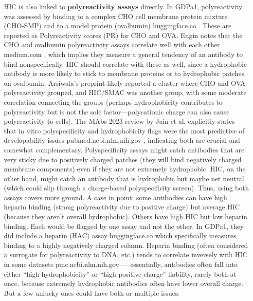 \documentclass[12pt]{article}
\begin{document}
HIC is also linked to \textbf{polyreactivity assays} directly. In GDPa1, polyreactivity was assessed by binding to a complex CHO cell membrane protein mixture (CHO-SMP) and to a model protein (ovalbumin)
huggingface.co
. These are reported as Polyreactivity scores (PR) for CHO and OVA. Engin notes that the CHO and ovalbumin polyreactivity assays correlate well with each other
medium.com
, which implies they measure a general tendency of an antibody to bind nonspecifically. HIC should correlate with these as well, since a hydrophobic antibody is more likely to stick to membrane proteins or to hydrophobic patches on ovalbumin. Arsiwala’s preprint likely reported a cluster where CHO and OVA polyreactivity grouped, and HIC/SMAC was another group, with some moderate correlation connecting the groups (perhaps hydrophobicity contributes to polyreactivity but is not the sole factor—polycationic charge can also cause polyreactivity to cells). The MAbs 2023 review by Jain et al. explicitly states that in vitro polyspecificity and hydrophobicity flags were the most predictive of developability issues
pubmed.ncbi.nlm.nih.gov
, indicating both are crucial and somewhat complementary. Polyspecificity assays might catch antibodies that are very sticky due to positively charged patches (they will bind negatively charged membrane components) even if they are not extremely hydrophobic. HIC, on the other hand, might catch an antibody that is hydrophobic but maybe net neutral (which could slip through a charge-based polyspecificity screen). Thus, using both assays covers more ground. A case in point: some antibodies can have high heparin binding (strong polyreactivity due to positive charge) but average HIC (because they aren’t overall hydrophobic). Others have high HIC but low heparin binding. Each would be flagged by one assay and not the other. In GDPa1, they did include a heparin (HAC) assay
huggingface.co
 which specifically measures binding to a highly negatively charged column. Heparin binding (often considered a surrogate for polyreactivity to DNA, etc.) tends to correlate inversely with HIC in some datasets
pmc.ncbi.nlm.nih.gov
 — essentially, antibodies often fall into either “high hydrophobicity” or “high positive charge” liability, rarely both at once, because extremely hydrophobic antibodies often have lower overall charge. But a few unlucky ones could have both or multiple issues.
\end{document}
